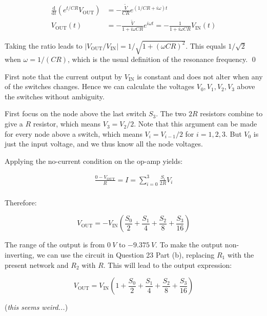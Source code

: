 \documentclass[12pt]{article}
\begin{document}
\begin{equation}
\begin{split}
    \frac{\mathrm{d}}{\mathrm{d}t} \left( e^{t/CR} V_{\text{OUT}} \right) &= -\frac{\tilde{V}}{CR} e^{(1/CR + i\omega)t} \\
    V_{\text{OUT}}(t) &= -\frac{\tilde{V}}{1 + i\omega CR} e^{i\omega t} = -\frac{1}{1 + i\omega CR} V_{\text{IN}}(t)
\end{split}
\end{equation}

Taking the ratio leads to $\left\lvert V_{\text{OUT}}/V_{\text{IN}} \right\rvert = 1/\sqrt{1 + (\omega CR)^{2}}$. This equals $1/\sqrt{2}$ when $\omega = 1/(CR)$, which is the usual definition of the resonance frequency.
\qed


First note that the current output by $V_{\text{IN}}$ is constant and does not alter when any of the switches changes. Hence we can calculate the voltages $V_{0}, V_{1}, V_{2}, V_{3}$ above the switches without ambiguity.

First focus on the node above the last switch $S_{3}$. The two $2R$ resistors combine to give a $R$ resistor, which means $V_{3} = V_{2}/2$. Note that this argument can be made for every node above a switch, which means $V_{i} = V_{i-1}/2$ for $i = 1, 2, 3$. But $V_{0}$ is just the input voltage, and we thus know all the node voltages.

Applying the no-current condition on the op-amp yields:

\begin{equation}
\begin{split}
    \frac{0 - V_{\text{OUT}}}{R} = I = \sum_{i = 0}^{3} \frac{S_{i}}{2R} V_{i} \\
\end{split}
\end{equation}

Therefore:

\begin{equation}
    V_{\text{OUT}} = - V_{\text{IN}} \left( \frac{S_{0}}{2} + \frac{S_{1}}{4} + \frac{S_{2}}{8} + \frac{S_{3}}{16} \right)
\end{equation}

The range of the output is from $\qty{0}{V}$ to $\qty{-9.375}{V}$. To make the output non-inverting, we can use the circuit in Question 23 Part (b), replacing $R_{1}$ with the present network and $R_{2}$ with $R$. This will lead to the output expression:

\begin{equation}
    V_{\text{OUT}} = V_{\text{IN}} \left( 1 + \frac{S_{0}}{2} + \frac{S_{1}}{4} + \frac{S_{2}}{8} + \frac{S_{3}}{16} \right)
\end{equation}

(\textit{this seems weird...})
\end{document}
